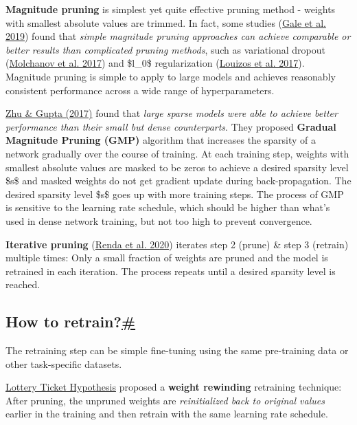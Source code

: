 \textbf{Magnitude pruning} is simplest yet quite effective pruning method - weights with smallest absolute values are trimmed. In fact, some studies (\href{https://arxiv.org/abs/1902.09574}{Gale et al. 2019}) found that \emph{simple magnitude pruning approaches can achieve comparable or better results than complicated pruning methods}, such as variational dropout (\href{https://arxiv.org/abs/1701.05369}{Molchanov et al. 2017}) and \$l\_0\$ regularization (\href{https://arxiv.org/abs/1712.01312}{Louizos et al. 2017}). Magnitude pruning is simple to apply to large models and achieves reasonably consistent performance across a wide range of hyperparameters.

\href{https://arxiv.org/abs/1710.01878}{Zhu \& Gupta (2017)} found that \emph{large sparse models were able to achieve better performance than their small but dense counterparts}. They proposed \textbf{Gradual Magnitude Pruning (GMP)} algorithm that increases the sparsity of a network gradually over the course of training. At each training step, weights with smallest absolute values are masked to be zeros to achieve a desired sparsity level \$s\$ and masked weights do not get gradient update during back-propagation. The desired sparsity level \$s\$ goes up with more training steps. The process of GMP is sensitive to the learning rate schedule, which should be higher than what's used in dense network training, but not too high to prevent convergence.

\textbf{Iterative pruning} (\href{https://arxiv.org/abs/2003.02389}{Renda et al. 2020}) iterates step 2 (prune) \& step 3 (retrain) multiple times: Only a small fraction of weights are pruned and the model is retrained in each iteration. The process repeats until a desired sparsity level is reached.

\subsection{\texorpdfstring{How to retrain?\hyperref[how-to-retrain]{\#}}{How to retrain?\#}}\label{how-to-retrain}

The retraining step can be simple fine-tuning using the same pre-training data or other task-specific datasets.

\href{https://lilianweng.github.io/posts/2019-03-14-overfit/\#the-lottery-ticket-hypothesis}{Lottery Ticket Hypothesis} proposed a \textbf{weight rewinding} retraining technique: After pruning, the unpruned weights are \emph{reinitialized back to original values} earlier in the training and then retrain with the same learning rate schedule.

